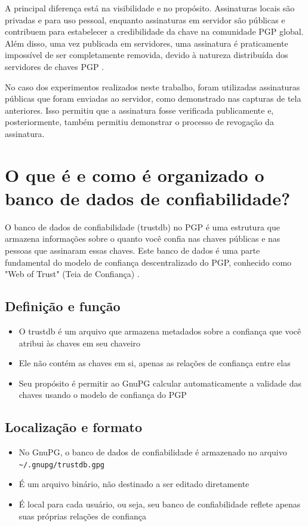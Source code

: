 A principal diferença está na visibilidade e no propósito. Assinaturas locais são privadas e para uso pessoal, enquanto assinaturas em servidor são públicas e contribuem para estabelecer a credibilidade da chave na comunidade PGP global. Além disso, uma vez publicada em servidores, uma assinatura é praticamente impossível de ser completamente removida, devido à natureza distribuída dos servidores de chaves PGP \cite{gnupgkeysigning}.

No caso dos experimentos realizados neste trabalho, foram utilizadas assinaturas públicas que foram enviadas ao servidor, como demonstrado nas capturas de tela anteriores. Isso permitiu que a assinatura fosse verificada publicamente e, posteriormente, também permitiu demonstrar o processo de revogação da assinatura.

\section{O que é e como é organizado o banco de dados de confiabilidade?}

O banco de dados de confiabilidade (trustdb) no PGP é uma estrutura que armazena informações sobre o quanto você confia nas chaves públicas e nas pessoas que assinaram essas chaves. Este banco de dados é uma parte fundamental do modelo de confiança descentralizado do PGP, conhecido como "Web of Trust" (Teia de Confiança) \cite{gnupgwot}.

\subsection{Definição e função}
\begin{itemize}
    \item O trustdb é um arquivo que armazena metadados sobre a confiança que você atribui às chaves em seu chaveiro
    \item Ele não contém as chaves em si, apenas as relações de confiança entre elas
    \item Seu propósito é permitir ao GnuPG calcular automaticamente a validade das chaves usando o modelo de confiança do PGP
\end{itemize}

\subsection{Localização e formato}
\begin{itemize}
    \item No GnuPG, o banco de dados de confiabilidade é armazenado no arquivo \texttt{\~{}/.gnupg/trustdb.gpg}
    \item É um arquivo binário, não destinado a ser editado diretamente
    \item É local para cada usuário, ou seja, seu banco de confiabilidade reflete apenas suas próprias relações de confiança
\end{itemize}

